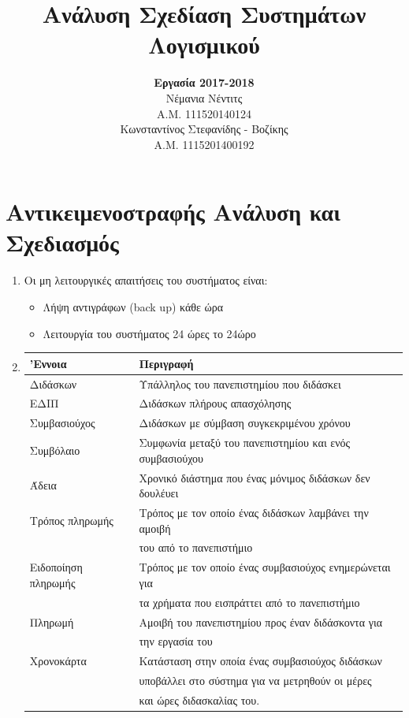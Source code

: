 \documentclass[12pt]{article}
\title{Ανάλυση Σχεδίαση Συστημάτων Λογισμικού}
\author{\textbf{Εργασία 2017-2018} \\Νέμανια Νέντιτς \\ Α.Μ. 111520140124 \\ Κωνσταντίνος Στεφανίδης - Βοζίκης \\ Α.Μ. 1115201400192}
\date{}
\begin{document}
\maketitle
\section*{Αντικειμενοστραφής Ανάλυση και Σχεδιασμός}
\begin{enumerate}
\item
Οι μη λειτουργικές απαιτήσεις του συστήματος είναι:
\begin{itemize}
\item
Λήψη αντιγράφων (\textlatin{back up}) κάθε ώρα
\item
Λειτουργία του συστήματος 24 ώρες το 24ώρο
\end{itemize}
\item
\begin{tabular}{|l|l|}
\hline
'Εννοια & Περιγραφή \\
\hline
Διδάσκων & Υπάλληλος του πανεπιστημίου που διδάσκει \\
\hline
ΕΔΙΠ & Διδάσκων πλήρους απασχόλησης \\
\hline
Συμβασιούχος & Διδάσκων με σύμβαση συγκεκριμένου χρόνου \\
\hline
Συμβόλαιο & Συμφωνία μεταξύ του πανεπιστημίου και ενός συμβασιούχου \\
\hline
Άδεια & Χρονικό διάστημα που ένας μόνιμος διδάσκων δεν δουλέυει \\ 
\hline
Τρόπος πληρωμής & Τρόπος με τον οποίο ένας διδάσκων λαμβάνει την αμοιβή \\ 
& του από το πανεπιστήμιο \\
\hline
Ειδοποίηση πληρωμής & Τρόπος με τον οποίο ένας συμβασιούχος ενημερώνεται για \\
 & τα χρήματα που εισπράττει από το πανεπιστήμιο \\
\hline
Πληρωμή & Αμοιβή του πανεπιστημίου προς έναν διδάσκοντα για \\ 
& την εργασία του \\ 
\hline
Χρονοκάρτα & Κατάσταση στην οποία ένας συμβασιούχος διδάσκων \\
 & υποβάλλει στο σύστημα για να μετρηθούν οι μέρες \\
 &  και ώρες διδασκαλίας του. \\
\hline
\end{tabular}


\end{enumerate}
\end{document}
